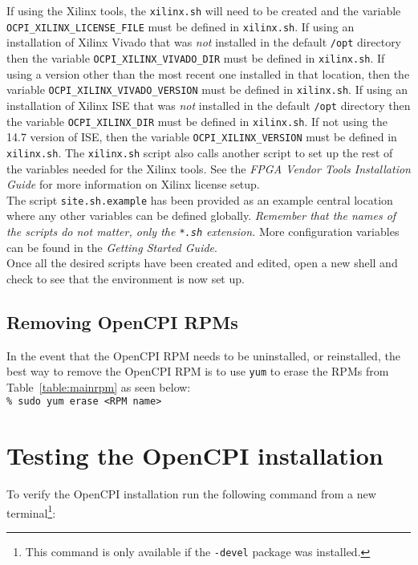 If using the Xilinx tools, the \verb+xilinx.sh+ will need to be created and the variable \verb+OCPI_XILINX_LICENSE_FILE+ must be defined in \verb+xilinx.sh+. If using an installation of Xilinx Vivado that was \textit{not} installed in the default \verb+/opt+ directory then the variable \verb+OCPI_XILINX_VIVADO_DIR+ must be defined in \verb+xilinx.sh+. If using a version other than the most recent one installed in that location, then the variable \verb+OCPI_XILINX_VIVADO_VERSION+ must be defined in \verb+xilinx.sh+. If using an installation of Xilinx ISE that was \textit{not} installed in the default \verb+/opt+ directory then the variable \verb+OCPI_XILINX_DIR+ must be defined in \verb+xilinx.sh+. If not using the 14.7 version of ISE, then the variable \verb+OCPI_XILINX_VERSION+ must be defined in \verb+xilinx.sh+. The \verb+xilinx.sh+ script also calls another script to set up the rest of the variables needed for the Xilinx tools. See the \textit{FPGA Vendor Tools Installation Guide} for more information on Xilinx license setup.\\

The script \verb+site.sh.example+ has been provided as an example central location where any other variables can be defined globally. \textit{Remember that the names of the scripts do not matter, only the \texttt{*.sh} extension.} More configuration variables can be found in the \textit{Getting Started Guide}.\\

Once all the desired scripts have been created and edited, open a new shell and check to see that the environment is now set up.

\subsection{Removing OpenCPI RPMs}
In the event that the OpenCPI RPM needs to be uninstalled, or reinstalled, the best way to remove the OpenCPI RPM is to use \verb+yum+ to erase the RPMs from Table~\ref{table:mainrpm} as seen below:\\

	\verb+% sudo yum erase <RPM name>+

\section{Testing the OpenCPI installation}
\label{sec:testing_opencpi}
To verify the OpenCPI installation run the following command from a new terminal\footnote{This command is only available if the \texttt{-devel} package was installed.}:\\

